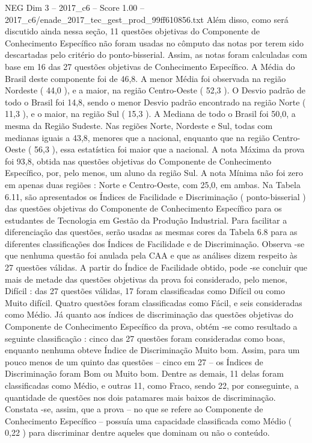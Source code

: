 \begin{textsample}{NEG Dim 3 – 2017\_c6 – Score 1.00 – 2017\_c6/enade\_2017\_tec\_gest\_prod\_99ff610856.txt}
Além disso, como será discutido ainda nessa seção, 11 questões objetivas do Componente de Conhecimento Específico não foram usadas no cômputo das notas por terem sido descartadas pelo critério do ponto-bisserial.
Assim, as notas foram calculadas com base em 16 das 27 questões objetivas de Conhecimento Específico.
A Média do Brasil deste componente foi de 46,8.
A menor Média foi observada na região Nordeste ( 44,0 ), e a maior, na região Centro-Oeste ( 52,3 ).
O Desvio padrão de todo o Brasil foi 14,8, sendo o menor Desvio padrão encontrado na região Norte ( 11,3 ), e o maior, na região Sul ( 15,3 ).
A Mediana de todo o Brasil foi 50,0, a mesma da Região Sudeste.
Nas regiões Norte, Nordeste e Sul, todas com medianas iguais a 43,8, menores que a nacional, enquanto que na região Centro-Oeste ( 56,3 ), essa estatística foi maior que a nacional.
A nota Máxima da prova foi 93,8, obtida nas questões objetivas do Componente de Conhecimento Específico, por, pelo menos, um aluno da região Sul.
A nota Mínima não foi zero em apenas duas regiões : Norte e Centro-Oeste, com 25,0, em ambas.
Na Tabela 6.11, são apresentados os Índices de Facilidade e Discriminação ( ponto-bisserial ) das questões objetivas do Componente de Conhecimento Específico para os estudantes de Tecnologia em Gestão da Produção Industrial.
Para facilitar a diferenciação das questões, serão usadas as mesmas cores da Tabela 6.8 para as diferentes classificações dos Índices de Facilidade e de Discriminação.
Observa -se que nenhuma questão foi anulada pela CAA e que as análises dizem respeito às 27 questões válidas.
A partir do Índice de Facilidade obtido, pode -se concluir que mais de metade das questões objetivas da prova foi considerado, pelo menos, Difícil : das 27 questões válidas, 17 foram classificadas como Difícil ou como Muito difícil.
Quatro questões foram classificadas como Fácil, e seis consideradas como Médio.
Já quanto aos índices de discriminação das questões objetivas do Componente de Conhecimento Específico da prova, obtém -se como resultado a seguinte classificação : cinco das 27 questões foram consideradas como boas, enquanto nenhuma obteve Índice de Discriminação Muito bom.
Assim, para um pouco menos de um quinto das questões – cinco em 27 – os Índices de Discriminação foram Bom ou Muito bom.
Dentre as demais, 11 delas foram classificadas como Médio, e outras 11, como Fraco, sendo 22, por conseguinte, a quantidade de questões nos dois patamares mais baixos de discriminação.
Constata -se, assim, que a prova – no que se refere ao Componente de Conhecimento Específico – possuía uma capacidade classificada como Médio ( 0,22 ) para discriminar dentre aqueles que dominam ou não o conteúdo.

\end{textsample}
